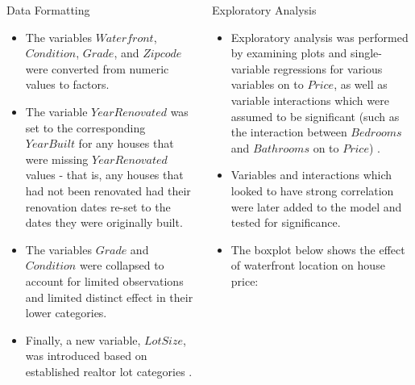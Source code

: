 \documentclass[final]{beamer}
\begin{document}
\begin{frame}[fragile]
\begin{columns}[t]
\begin{column}{0.31\linewidth}
\begin{minipage}[t][.955\textheight]{\linewidth}
\vspace{0ex}
\begin{block}{Data Formatting}
\begin{itemize}
\item The variables $Waterfront$, $Condition$, $Grade$, and $Zipcode$ were converted from numeric values to factors.
\item The variable $YearRenovated$ was set to the corresponding $YearBuilt$ for any houses that were missing $YearRenovated$ values - that is, any houses that had not been renovated had their renovation dates re-set to the dates they were originally built.
\item The variables $Grade$ and $Condition$ were collapsed to account for limited observations and limited distinct effect in their lower categories.
\item Finally, a new variable, $LotSize$, was introduced based on established realtor lot categories \cite{pardoe_modeling_2008}.
\end{itemize}
\vspace{0ex}
\end{block}
\vfill

\end{minipage}
\end{column}%


\begin{column}{0.31\linewidth}
\begin{minipage}[t][.955\textheight]{\linewidth} 
\begin{block}{Exploratory Analysis}
\begin{itemize}
\item Exploratory analysis was performed by examining plots and single-variable regressions for various variables on to $Price$, as well as variable interactions which were assumed to be significant (such as the interaction between $Bedrooms$ and $Bathrooms$ on to $Price$) \cite{james_introduction_2013}. 
\item Variables and interactions which looked to have strong correlation were later added to the model and tested for significance.
\item The boxplot below shows the effect of waterfront location on house price:
\end{itemize}


\end{block}
\end{minipage}
\end{column}
\end{columns}
\end{frame}
\end{document}
